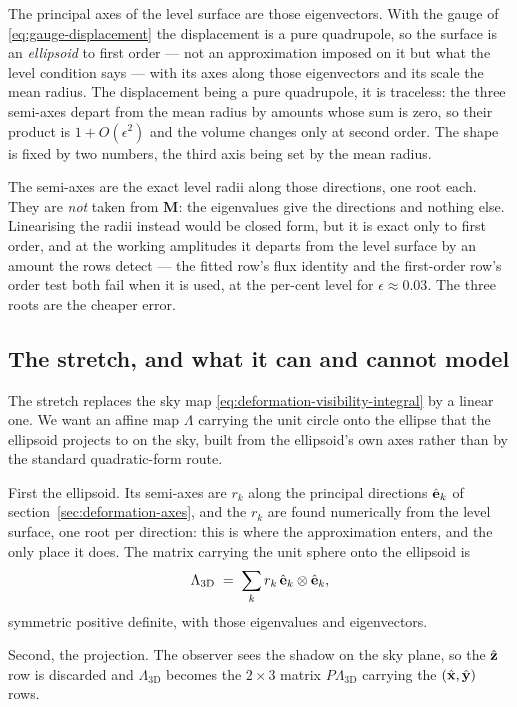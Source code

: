 The principal axes of the level surface are those eigenvectors.  With the gauge of
\eqref{eq:gauge-displacement} the displacement is a pure quadrupole, so the surface is an
\emph{ellipsoid} to first order --- not an approximation imposed on it but what the level
condition says --- with its axes along those eigenvectors and its scale the mean radius.
The displacement being a pure quadrupole, it is traceless: the three semi-axes depart from the
mean radius by amounts whose sum is zero, so their product is $1 + O(\epsilon^{2})$ and the
volume changes only at second order.  The shape is fixed by two numbers, the third axis being
set by the mean radius.

The semi-axes are the exact level radii along those directions, one root each.  They are \emph{not}
taken from $\mathbf{M}$: the eigenvalues give the directions and nothing else.  Linearising the
radii instead would be closed form, but it is exact only to first order, and at the working
amplitudes it departs from the level surface by an amount the rows detect --- the fitted row's
flux identity and the first-order row's order test both fail when it is used, at the per-cent
level for $\epsilon \approx 0.03$.  The three roots are the cheaper error.

\subsection{The stretch, and what it can and cannot model}
\label{sec:deformation-stretch}

The stretch replaces the sky map \eqref{eq:deformation-visibility-integral} by a linear one.  We
want an affine map $\Lambda$ carrying the unit circle onto the ellipse that the ellipsoid projects
to on the sky, built from the ellipsoid's own axes rather than by the standard quadratic-form
route.

First the ellipsoid.  Its semi-axes are $r_k$ along the principal directions
$\hat{\mathbf e}_k$ of section~\ref{sec:deformation-axes}, and the $r_k$ are found numerically from
the level surface, one root per direction: this is where the approximation enters, and the only
place it does.  The matrix carrying the unit sphere onto the ellipsoid is
\begin{equation}
  \Lambda_{\mathrm{3D}} \;=\; \sum_k r_k\,\hat{\mathbf e}_k\otimes\hat{\mathbf e}_k ,
  \label{eq:deformation-stretch-3d}
\end{equation}
symmetric positive definite, with those eigenvalues and eigenvectors.

Second, the projection.  The observer sees the shadow on the sky plane, so the $\hat{\mathbf z}$
row is discarded and $\Lambda_{\mathrm{3D}}$ becomes the $2\times3$ matrix $P\Lambda_{\mathrm{3D}}$
carrying the $(\hat{\mathbf x},\hat{\mathbf y})$ rows.

